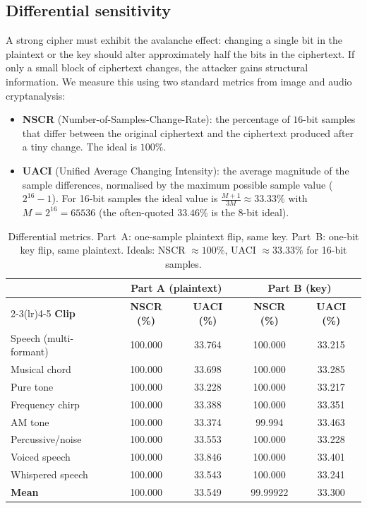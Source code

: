 \documentclass[pdflatex,sn-mathphys-num]{sn-jnl}%
\theoremstyle{thmstyleone}%
\theoremstyle{thmstyletwo}%
\theoremstyle{thmstylethree}%
\begin{document}
\subsection{Differential sensitivity}
\label{sec:differential}

A strong cipher must exhibit the avalanche effect: changing a single bit in the plaintext or the key should alter approximately half the bits in the ciphertext. If only a small block of ciphertext changes, the attacker gains structural information. We measure this using two standard metrics from image and audio cryptanalysis:

\begin{itemize}
\item \textbf{NSCR} (Number-of-Samples-Change-Rate): the percentage of $16$-bit samples that differ between the original ciphertext and the ciphertext produced after a tiny change. The ideal is $100\%$.
\item \textbf{UACI} (Unified Average Changing Intensity): the average magnitude of the sample differences, normalised by the maximum possible sample value ($2^{16}-1$). For 16-bit samples the ideal value is $\frac{M+1}{3M}\approx 33.33\%$ with $M=2^{16}=65536$ (the often-quoted $33.46\%$ is the 8-bit ideal).
\end{itemize}

\begin{table}[htbp]
\centering
\caption{Differential metrics. Part~A: one-sample plaintext flip, same key. Part~B: one-bit key flip, same plaintext. Ideals: NSCR $\approx100\%$, UACI $\approx33.33\%$ for 16-bit samples.}
\label{tab:diff}
\small
\begin{tabular}{lcccc}
\toprule
 & \multicolumn{2}{c}{\textbf{Part A (plaintext)}} & \multicolumn{2}{c}{\textbf{Part B (key)}} \\
\cmidrule(lr){2-3}\cmidrule(lr){4-5}
\textbf{Clip} & \textbf{NSCR (\%)} & \textbf{UACI (\%)} & \textbf{NSCR (\%)} & \textbf{UACI (\%)} \\
\midrule
Speech (multi-formant) & 100.000 & 33.764 & 100.000 & 33.215 \\
Musical chord & 100.000 & 33.698 & 100.000 & 33.285 \\
Pure tone & 100.000 & 33.228 & 100.000 & 33.217 \\
Frequency chirp & 100.000 & 33.388 & 100.000 & 33.351 \\
AM tone & 100.000 & 33.374 & 99.994 & 33.463 \\
Percussive/noise & 100.000 & 33.553 & 100.000 & 33.228 \\
Voiced speech & 100.000 & 33.846 & 100.000 & 33.401 \\
Whispered speech & 100.000 & 33.543 & 100.000 & 33.241 \\
\midrule
\textbf{Mean} & 100.000 & 33.549 & 99.99922 & 33.300 \\
\bottomrule
\end{tabular}
\end{table}
\end{document}
